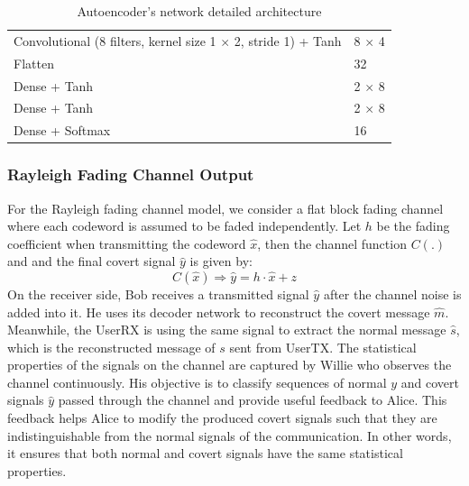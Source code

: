 \begin{table}
\begin{adjustbox}{width=0.85\columnwidth,center}
\begin{tabular}{|l|l|}
		Convolutional (8 filters, kernel size 1 $\times$ 2, stride 1) + Tanh 	&   8 $\times$ 4		\\
		Flatten															 		&   32					\\
		Dense + Tanh															&	2 $\times$ 8		\\
		Dense + Tanh															&	2 $\times$ 8		\\
		Dense + Softmax															&	16					\\ 
		\hline
	\end{tabular}
	\end{adjustbox}
	\caption{Autoencoder's network detailed architecture}
\end{table}

\subsubsection{Rayleigh Fading Channel Output}
For the Rayleigh fading channel model, we consider a flat block fading channel where each codeword is assumed to be faded independently. Let \(h\) be the fading coefficient when transmitting the codeword \(\hat{x}\), then the channel function \(C(.)\) and and the final covert signal \(\hat{y}\) is given by:
\begin{equation}
	C(\hat{x}) \Rightarrow \hat{y} = h \cdot \hat{x} + z
\end{equation}
On the receiver side, Bob receives a transmitted signal \(\hat{y}\) after the channel noise is added into it. He uses its decoder network to reconstruct the covert message \(\hat{m}\). Meanwhile, the UserRX is using the same signal to extract the normal message \(\hat{s}\), which is the reconstructed message of \(s\) sent from UserTX. The statistical properties of the signals on the channel are captured by Willie who observes the channel continuously. His objective is to classify sequences of normal \(y\) and covert signals \(\hat{y}\) passed through the channel and provide useful feedback to Alice. This feedback helps Alice to modify the produced covert signals such that they are indistinguishable from the normal signals of the communication. In other words, it ensures that both normal and covert signals have the same statistical properties.
